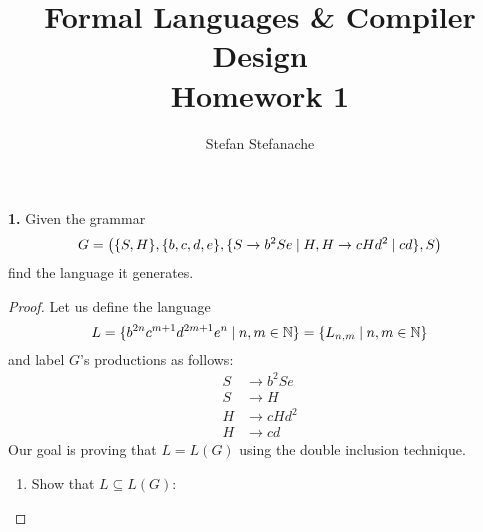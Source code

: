 \documentclass[11pt]{article}
\title{\textbf{Formal Languages \& Compiler Design \\ Homework 1}}
\author{Stefan Stefanache}
\begin{document}
    \maketitle
    \noindent \textbf{1.} Given the grammar 
    \begin{equation}
        G = \big(\{S, H\}, 
        \{b, c, d, e\}, 
        \{S \to b^2Se \hspace{0.25em} | \hspace{0.25em} H, H \to cHd^2 \hspace{0.25em} | \hspace{0.25em} cd\}, 
        S\big)
    \end{equation}
    find the language it generates.

    \vspace{1em}

    \begin{proof}
        Let us define the language
        \begin{equation}\label{lang:1}
            L = \{b^{2n}c^{m + 1}d^{2m + 1}e^{n} \hspace{0.25em}|\hspace{0.25em} n, m \in \mathbb{N}\}
            = \{L_{n, m} \hspace{0.25em}|\hspace{0.25em} n, m \in \mathbb{N}\}
        \end{equation} 
        and label $G$'s productions as follows:
        \begin{align}
            S &\to b^2Se \label{rule:1.1} \\
            S &\to H \label{rule:1.2} \\
            H &\to cHd^2 \label{rule:1.3} \\
            H &\to cd \label{rule:1.4}
        \end{align}
        Our goal is proving that $L = L(G)$ using the double inclusion technique. 
        \begin{enumerate}
            \item Show that $L \subseteq L(G)$:


\end{enumerate}
\end{proof}
\end{document}
